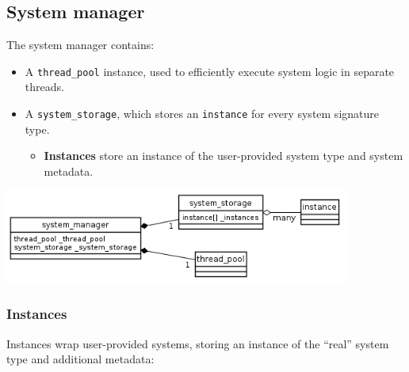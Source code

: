 \documentclass[twoside, 12pt, a4paper, openany]{book}
\let\origfigure=\figure
\let\endorigfigure=\endfigure
\renewenvironment{figure}[1][]{%
\origfigure[H]
}{%
\endorigfigure
}
\providecommand{\tightlist}{%
  \setlength{\itemsep}{0pt}\setlength{\parskip}{0pt}}
\begin{document}
\hypertarget{architecture_system_mgr}{\subsection{System
manager}\label{architecture_system_mgr}}

The system manager contains:

\begin{itemize}
\item
  A
  \texttt{thread_pool}
  instance, used to efficiently execute system logic in separate
  threads.
\item
  A
  \texttt{system_storage},
  which stores an
  \texttt{instance}
  for every system signature type.

  \begin{itemize}
  \tightlist
  \item
    \textbf{Instances} store an instance of the user-provided system
    type and system metadata.
  \end{itemize}
\end{itemize}

\begin{figure}[htbp]
\centering
\includegraphics[width=0.85000\textwidth]{source/figures/generated/ecst/architecture/system_manager.png}
\caption{ECST architecture: system manager}
\end{figure}

\subsubsection{Instances}\label{instances}

Instances wrap user-provided systems, storing an instance of the
``real'' system type and additional metadata:
\end{document}
